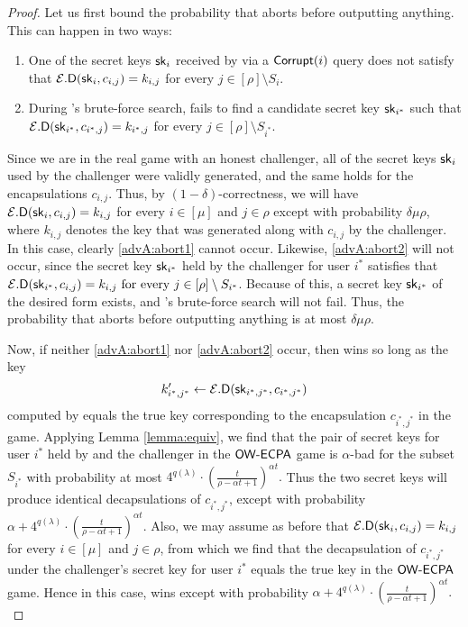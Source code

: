 \begin{proof}
  Let us first bound the probability that \advA aborts before outputting anything.
  This can happen in two ways:
  \begin{enumerate}
    \item\label{advA:abort1} One of the secret keys \(\mathsf{sk}_{i}\) received by \advA
          via a \(\mathsf{Corrupt}(i)\) query does not satisfy that \(\mathcal{E}.\mathsf{D}(\mathsf{sk}_{i}, c_{i,j}) = k_{i,j}\)
          for every \(j \in [\rho] \setminus S_{i}\).
    \item\label{advA:abort2} During \advA's brute-force search, \advA fails to find a candidate secret key \(\mathsf{sk}_{i^{*}}\)
          such that \(\mathcal{E}.\mathsf{D}(\mathsf{sk}_{i^{*}}, c_{i^{*},j}) = k_{i^{*},j}\) for every \(j \in [\rho] \setminus S_{i^{*}}\).
  \end{enumerate}
  Since we are in the real game with an honest challenger,
  all of the secret keys \(\mathsf{sk}_{i}\) used by the challenger
  were validly generated, and the same holds for the encapsulations \(c_{i,j}\).
  Thus, by \((1 - \delta)\)-correctness,
  we will have \(\mathcal{E}.\mathsf{D}(\mathsf{sk}_{i},c_{i,j}) = k_{i,j}\) for every \(i \in [\mu]\) and \(j \in \rho\)
  except with probability \(\delta \mu \rho\),
  where \(k_{i,j}\) denotes the key that was generated along with \(c_{i,j}\) by the challenger.
  In this case, clearly \ref{advA:abort1} cannot occur.
  Likewise, \ref{advA:abort2} will not occur,
  since the secret key \(\mathsf{sk}_{i^{*}}\) held by the challenger for user \(i^{*}\)
  satisfies that \(\mathcal{E}.\mathsf{D}(\mathsf{sk}_{i^{*}}, c_{i,j}) = k_{i,j} \text{ for every } j \in [\rho] \setminus S_{i^{*}}\).
  Because of this, a secret key \(\mathsf{sk}_{i^{*}}\) of the desired form exists,
  and \advA's brute-force search will not fail.
  Thus, the probability that \advA aborts before outputting anything is at most \(\delta \mu \rho\).

  Now, if neither \ref{advA:abort1} nor \ref{advA:abort2} occur,
  then \advA wins so long as the key
  \[
  k_{i^{*},j^{*}}' \leftarrow \mathcal{E}.\mathsf{D}(\mathsf{sk}_{i^{*},j^{*}}, c_{i^{*},j^{*}})
  \]
  computed by \advA equals the true key corresponding to the encapsulation \(c_{i^{*},j^{*}}\) in the game.
  Applying Lemma \ref{lemma:equiv},
  we find that the pair of secret keys for user \(i^{*}\) held by \advA
  and the challenger in the \(\mathsf{OW}\text{-}\mathsf{ECPA}\) game is
  \(\alpha\)-bad for the subset \(S_{i^{*}}\) with probability at most
  \(
    4^{q(\lambda)} \cdot \left( \frac{t}{\rho - \alpha t + 1} \right)^{\alpha t}.
  \)
  Thus the two secret keys will produce identical decapsulations of \(c_{i^{*},j^{*}}\), except with probability
  \(
    \alpha +
    4^{q(\lambda)} \cdot \left( \frac{t}{\rho - \alpha t + 1} \right)^{\alpha t}.
  \)
  Also, we may assume as before that
  \(\mathcal{E}.\mathsf{D}(\mathsf{sk}_{i},c_{i,j}) = k_{i,j}\) for every \(i \in [\mu]\) and \(j \in \rho\),
  from which we find that the decapsulation of \(c_{i^{*},j^{*}}\)
  under the challenger's secret key for user \(i^{*}\)
  equals the true key in the \(\mathsf{OW}\text{-}\mathsf{ECPA}\) game.
  Hence in this case, \advA wins except with probability
  \(
  \alpha
  + 4^{q(\lambda)} \cdot \left( \frac{t}{\rho - \alpha t + 1} \right)^{\alpha t}.
  \)


\end{proof}
